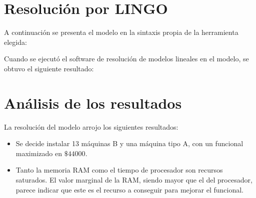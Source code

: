 \documentclass[a4paper,11pt]{article}
\begin{document}
\FloatBarrier

\section{Resolución por LINGO}\label{sec:lingo}

A continuación se presenta el modelo en la sintaxis propia de la herramienta
elegida:



Cuando se ejecutó el software de resolución de modelos lineales en el modelo,
se obtuvo el siguiente resultado:



\section{Análisis de los resultados}

La resolución del modelo arrojo los siguientes resultados:

\begin{itemize}

  \item Se decide instalar 13 máquinas B y una máquina tipo A, con un funcional
    maximizado en \(\$44000\).

  \item Tanto la memoria RAM como el tiempo de procesador son recursos
    saturados. El valor marginal de la RAM, siendo mayor que el del procesador,
    parece indicar que este es el recurso a conseguir para mejorar el
    funcional.

\end{itemize}
\end{document}
